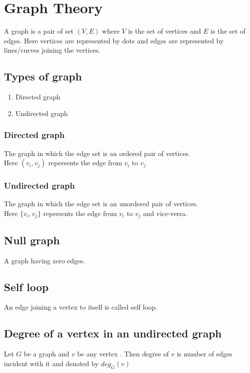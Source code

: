 \documentclass[11pt,letterpaper]{article}
\newenvironment{example}                             
        {\noindent\textit{Example:}\\}
	{}
\begin{document}
\section{Graph Theory}
A graph is a pair of set $(V,E)$ where $V$ is the set of vertices and $E$ is the set of edges. 
Here vertices are represented by dots and edges are represented by lines/curves joining the vertices.
\subsection{Types of graph}
\begin{enumerate}
  \item Directed graph
  \item Undirected graph
\end{enumerate}

\subsubsection{Directed graph}
The graph in which the edge set is an ordered pair of vertices. \\
Here $(v_i, v_j)$ repersents the edge from $v_i$ to $v_j$
\subsubsection{Undirected graph}
The graph in which the edge set is an unordered pair of vertices. \\
Here $\{v_i, v_j\}$ repersents the edge from $v_i$ to $v_j$ and vice-versa.

\subsection{Null graph}
A graph having zero edges.

\subsection{Self loop}
An edge joining a vertex to itself is called self loop.

\subsection{Degree of a vertex in an undirected graph}
Let $G$ be a graph and $v$ be any vertex . Then degree of $v$ is number of edges incident with it and denoted by $deg_G(v)$
\end{document}
